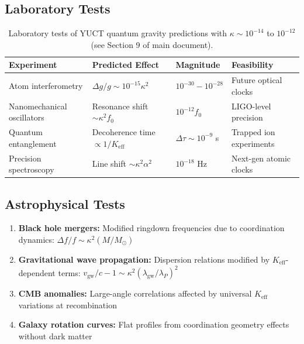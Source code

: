 \documentclass[12pt,a4paper]{article}
\theoremstyle{remark}
\newcommand{\Keff}{K_{\mathrm{eff}}}
\begin{document}
	\subsection{Laboratory Tests}
	
\begin{table}[htbp]
	\centering
	\begin{tabular}{p{2.8cm}p{4.2cm}p{2.5cm}p{2.5cm}}
		\toprule
		\textbf{Experiment} & \textbf{Predicted Effect} & \textbf{Magnitude} & \textbf{Feasibility} \\
		\midrule
		Atom interferometry & $\Delta g/g \sim 10^{-15}\kappa^2$ & $10^{-30} - 10^{-28}$ & Future optical clocks \\
		Nanomechanical oscillators & Resonance shift $\sim \kappa^2 f_0$ & $10^{-12} f_0$ & LIGO-level precision \\
		Quantum entanglement & Decoherence time $\propto 1/\Keff$ & $\Delta\tau \sim 10^{-9}$ s & Trapped ion experiments \\
		Precision spectroscopy & Line shift $\sim \kappa^2 \alpha^2$ & $10^{-18}$ Hz & Next-gen atomic clocks \\
		\bottomrule
	\end{tabular}
	\caption{Laboratory tests of YUCT quantum gravity predictions with $\kappa \sim 10^{-14}$ to $10^{-12}$ (see Section 9 of main document).}
	\label{tab:lab-tests}
\end{table}
	
	\subsection{Astrophysical Tests}
	
	\begin{enumerate}
		\item \textbf{Black hole mergers:} Modified ringdown frequencies due to coordination dynamics: $\Delta f/f \sim \kappa^2 (M/M_\odot)$
		
		\item \textbf{Gravitational wave propagation:} Dispersion relations modified by $\Keff$-dependent terms: $v_{\text{gw}}/c - 1 \sim \kappa^2 (\lambda_{\text{gw}}/\lambda_P)^2$
		
		\item \textbf{CMB anomalies:} Large-angle correlations affected by universal $\Keff$ variations at recombination
		
		\item \textbf{Galaxy rotation curves:} Flat profiles from coordination geometry effects without dark matter
	\end{enumerate}
	
\end{document}
